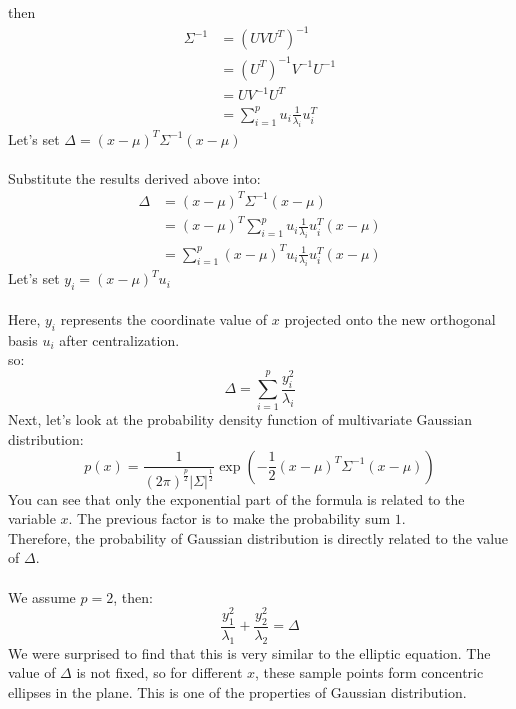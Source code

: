 \documentclass{report}
\begin{document}
then
$$
\begin{aligned}
\Sigma^{-1}
&=(UVU^T)^{-1}\\
&=(U^T)^{-1}V^{-1}U^{-1}\\
&=UV^{-1}U^T\\
&=\sum_{i=1}^p u_i \frac{1}{\lambda_i} u_i^T
\end{aligned}
$$
Let's set $\Delta = (x-\mu)^T \Sigma^{-1} (x-\mu)$\\\\
Substitute the results derived above into:
$$
\begin{aligned}
\Delta
&=(x-\mu)^T \Sigma^{-1} (x-\mu)\\
&=(x-\mu)^T \sum_{i=1}^p u_i \frac{1}{\lambda_i}u_i^T (x-\mu)\\
&=\sum_{i=1}^p(x-\mu)^T u_i \frac{1}{\lambda_i}u_i^T (x-\mu)
\end{aligned}
$$
Let's set $y_i=(x-\mu)^T u_i$\\\\
Here, $y_i $ represents the coordinate value of $x$ projected onto the new orthogonal basis $u_i$ after centralization.\\
so:
$$
\Delta=\sum_{i=1}^p \frac{y_i^2}{\lambda_i}
$$
Next, let's look at the probability density function of multivariate Gaussian distribution:
$$
p(x)=\frac{1}{(2\pi)^{\frac{p}{2}}|\Sigma|^{\frac{1}{2}}} \exp(-\frac{1}{2}(x-\mu)^T \Sigma^{-1}(x-\mu))
$$
You can see that only the exponential part of the formula is related to the variable $x $. The previous factor is to make the probability sum $1 $.\\
Therefore, the probability of Gaussian distribution is directly related to the value of $\Delta $.\\\\
We assume $p=2$, then:
$$
\frac{y_1^2}{\lambda_1}+\frac{y_2^2}{\lambda_2}=\Delta
$$
We were surprised to find that this is very similar to the elliptic equation. The value of $\Delta$ is not fixed, so for different $x$, these sample points form concentric ellipses in the plane. This is one of the properties of Gaussian distribution.
\end{document}
